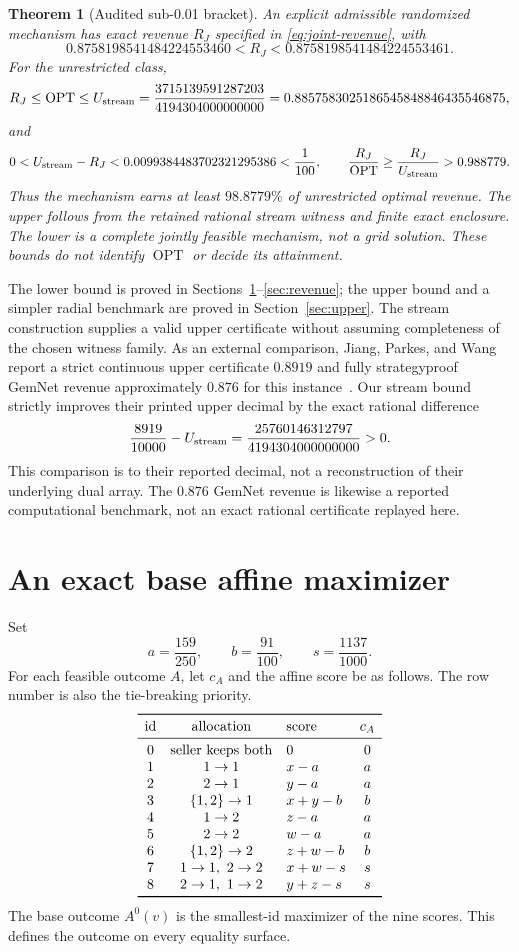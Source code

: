 \documentclass[11pt]{article}
\newtheorem{theorem}{Theorem}
\newcommand{\OPT}{\operatorname{OPT}}
\newcommand{\Ustream}{U_{\rm stream}}
\newcommand{\UpperBound}{\frac{3715139591287203}{4194304000000000}}
\newcommand{\UpperDecimal}{0.8857583025186545848846435546875}
\begin{document}
\begin{theorem}[Audited sub-0.01 bracket]\label{thm:bracket}
An explicit admissible randomized mechanism has exact revenue $R_J$ specified
in \eqref{eq:joint-revenue}, with
\[
0.8758198541484224553460<R_J<0.8758198541484224553461.
\]
For the unrestricted class,
\[
R_J\le\OPT\le\Ustream=\UpperBound=\UpperDecimal,
\]
and
\[
0<\Ustream-R_J<0.0099384483702321295386<\frac1{100},
\qquad \frac{R_J}{\OPT}\ge\frac{R_J}{\Ustream}>0.988779.
\]
Thus the mechanism earns at least $98.8779\%$ of unrestricted optimal revenue.
The upper follows from the retained rational stream witness and finite exact
enclosure. The lower is a complete jointly feasible mechanism, not a grid
solution. These bounds do not identify $\OPT$ or decide its attainment.
\end{theorem}

The lower bound is proved in Sections~\ref{sec:base}--\ref{sec:revenue};
the upper bound and a simpler radial benchmark are proved in
Section~\ref{sec:upper}.  The stream construction supplies a valid upper
certificate without assuming completeness of the chosen witness family.
As an external
comparison, Jiang, Parkes, and Wang report a strict continuous upper
certificate \(0.8919\) and fully strategyproof GemNet revenue approximately
\(0.876\) for this instance~\citep{jiang2026duality}.  Our stream bound
strictly improves their printed upper decimal by the exact rational difference
\[
\frac{8919}{10000}-\Ustream
=\frac{25760146312797}{4194304000000000}>0.
\]
This comparison is to their reported decimal, not a reconstruction of their
underlying dual array.  The \(0.876\) GemNet revenue is likewise a reported
computational benchmark, not an exact rational certificate replayed here.

\section{An exact base affine maximizer}\label{sec:base}

Set
\[
a=\frac{159}{250},\qquad b=\frac{91}{100},\qquad
s=\frac{1137}{1000}.
\]
For each feasible outcome \(A\), let \(c_A\) and the affine score be as follows.
The row number is also the tie-breaking priority.
\[
\begin{array}{cclc}
\toprule
\text{id}&\text{allocation}&\text{score}&c_A\\
\midrule
0&\text{seller keeps both}&0&0\\
1&1\to1&x-a&a\\
2&2\to1&y-a&a\\
3&\{1,2\}\to1&x+y-b&b\\
4&1\to2&z-a&a\\
5&2\to2&w-a&a\\
6&\{1,2\}\to2&z+w-b&b\\
7&1\to1,\ 2\to2&x+w-s&s\\
8&2\to1,\ 1\to2&y+z-s&s\\
\bottomrule
\end{array}
\]
The base outcome \(A^0(v)\) is the smallest-id maximizer of the nine scores.
This defines the outcome on every equality surface.
\end{document}
